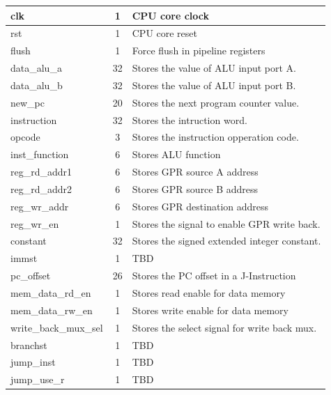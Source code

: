 \documentclass{article}
\begin{document}
\begin{center}
\begin{longtable}[pos]{| m{4cm} | c | m{7.5cm} |}
        \hline
        \endlastfoot
        clk                 & 1   & CPU core clock    \\ \hline
        rst                 & 1   & CPU core reset    \\ \hline
        flush               & 1   & Force flush in pipeline registers \\ \hline
        data\_alu\_a    & 32  & Stores the value of ALU input port A.  \\ \hline
        data\_alu\_b    & 32  & Stores the value of ALU input port B. \\ \hline
        new\_pc         & 20  & Stores the next program counter value.\\ \hline
        instruction     & 32  & Stores the intruction word.    \\ \hline        
        opcode              & 3   & Stores the instruction opperation code. \\ \hline
        inst\_function  & 6   & Stores ALU function  \\ \hline
        reg\_rd\_addr1  & 6   & Stores GPR source A address  \\ \hline
        reg\_rd\_addr2  & 6   & Stores GPR source B address  \\ \hline
        reg\_wr\_addr   & 6   & Stores GPR destination address  \\ \hline
        reg\_wr\_en     & 1   & Stores the signal to enable GPR write back. \\ \hline         
        constant        & 32  & Stores the signed extended integer constant. \\ \hline 
        immst       & 1   & TBD  \\ \hline
        pc\_offset      & 26  & Stores the PC offset in a J-Instruction \\ \hline
        mem\_data\_rd\_en & 1  & Stores read enable for data memory \\ \hline
        mem\_data\_rw\_en & 1  & Stores write enable for data memory \\ \hline
        write\_back\_mux\_sel  & 1 & Stores the select signal for write back mux. \\ \hline
        branchst    & 1   & TBD \\ \hline
        jump\_inst      & 1   & TBD \\ \hline
        jump\_use\_r    & 1   & TBD \\ \hline
      \end{longtable}
    \end{center} 
\end{document}
